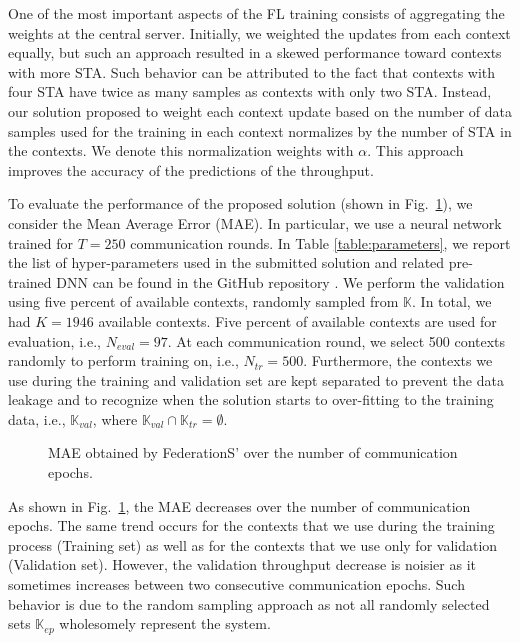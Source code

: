 \documentclass[10pt,a4paper,twocolumn]{article}
\newcommand{\ITUpar}{\vspace{8pt}\par}
\def\startfigure{\vspace{6pt}\begin{figure}[ht]\center}
\begin{document}
One of the most important aspects of the FL training consists of aggregating the weights at the central server. Initially, we weighted the updates from each context equally, but such an approach resulted in a skewed performance toward contexts with more STA. Such behavior can be attributed to the fact that contexts with four STA have twice as many samples as contexts with only two STA. Instead, our solution proposed to weight each context update based on the number of data samples used for the training in each context normalizes by the number of STA in the contexts. We denote this normalization weights with $\alpha$. This approach improves the accuracy of the predictions of the throughput. \ITUpar

To evaluate the performance of the proposed solution (shown in Fig.~\ref{fig:MAE}), we consider the Mean Average Error (MAE). In particular, we use a neural network trained for $T=250$ communication rounds. In Table \ref{table:parameters}, we report the list of hyper-parameters used in the submitted solution and related pre-trained DNN can be found in the GitHub repository \cite{federations2021repository}. We perform the validation using five percent of available contexts, randomly sampled from $\mathbb{K}$. In total, we had $K=1946$ available contexts. Five percent of available contexts are used for evaluation, i.e., $N_{eval}=97$. At each communication round, we select 500 contexts randomly to perform training on, i.e., $N_{tr}=500$. Furthermore, the contexts we use during the training and validation set are kept separated to prevent the data leakage and to recognize when the solution starts to over-fitting to the training data, i.e., $\mathbb{K}_{val}$,  where $\mathbb{K}_{val}  \cap \mathbb{K}_{tr} = \emptyset$.\ITUpar

\startfigure
\centering

\caption{MAE obtained by FederationS' over the number of communication epochs.}
\label{fig:MAE}
\end{figure} 

As shown in Fig.~\ref{fig:MAE}, the MAE decreases over the number of communication epochs. The same trend occurs for the contexts that we use during the training process (Training set) as well as for the contexts that we use only for validation (Validation set). However, the validation throughput decrease is noisier as it sometimes increases between two consecutive communication epochs. Such behavior is due to the random sampling approach as not all randomly selected sets $\mathbb{K}_{ep}$ wholesomely represent the system.\ITUpar
\end{document}
